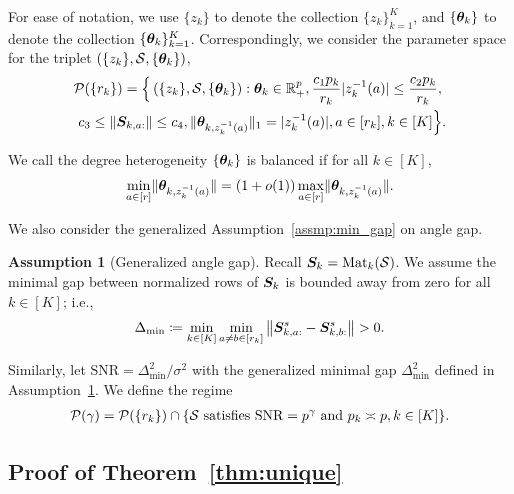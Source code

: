 \documentclass[journal]{IEEEtran}
\theoremstyle{definition}
\theoremstyle{definition}
\newtheorem{assumption}{Assumption}
\newcommand{\of}[1]{\left(#1\right)}
\begin{document}
For ease of notation, we use $\{z_k\}$ to denote the collection $\{z_k\}_{k=1}^K$, and $\{\boldsymbol{\theta}_k\}$ to denote the collection $\{\boldsymbol{\theta}_k\}_{k=1}^K$. Correspondingly, we consider the parameter space for the triplet $\of{\{z_k\}, \tS, \{\mtheta_k\}}$,
\small
\begin{align}
 & \tP(\{r_k\}) = \Big\{ \of{\{z_k\}, \tS, \{\mtheta_k\}}: \mtheta_k \in\mathbb{R}^p_{+}, {c_1 p_k\over r_k} |z_k^{-1}(a)| \leq {c_2 p_k\over r_k}, \\ & \ c_3 \leq  \onorm{\mS_{k,a:}} \leq c_4 ,\onormSize{}{\mtheta_{k,z_k^{-1}(a)}}_1=|z_k^{-1}(a)|, a \in [r_k], k\in[K]\Big\}. \label{eq:general_family}
\end{align}
\normalsize


We call the degree heterogeneity $\{\boldsymbol{\theta}_k\}$ is balanced if for all $k \in [K]$,
\begin{equation}\label{eq:general_balanced}
    {\min_{a\in[r]} \onormSize{}{\mtheta_{k, z_k^{-1}(a)}}=\left(1+o(1)\right)\max_{a\in[r]}\onormSize{}{\mtheta_{k,z_k^{-1}(a)}}}.
\end{equation}


We also consider the generalized Assumption~\ref{assmp:min_gap} on angle gap.
\begin{assumption}[Generalized angle gap]\label{assmp:general_minimal_gap} Recall $\bm S_k=\text{Mat}_k(\mathcal{S})$. We assume the minimal gap between normalized rows of $\bm S_k$ is bounded away from zero for all $k\in[K]$; i.e.,
\begin{equation}
     \Delta_{\min} \coloneqq \min_{k \in [K]} \min_{a \neq b \in [r_k]} \left\lVert \bm S_{k,a:}^s - \bm S_{k, b:}^s \right\rVert > 0.
\end{equation}
\end{assumption}
Similarly, let $\text{SNR} = \Delta_{\min}^2/\sigma^2$ with the generalized minimal gap $\Delta_{\min}^2$ defined in Assumption~\ref{assmp:general_minimal_gap}. We define the regime
\small
\begin{align}
    \mathcal{P}(\gamma) = \mathcal{P} (\{r_k\}) \cap\{\mathcal{S} \text{ satisfies $\text{SNR} = p^{\gamma}$ and $p_k \asymp p, k \in [K]$} \}.
\end{align}
\normalsize

\subsection{Proof of Theorem~\ref{thm:unique}}
\end{document}
